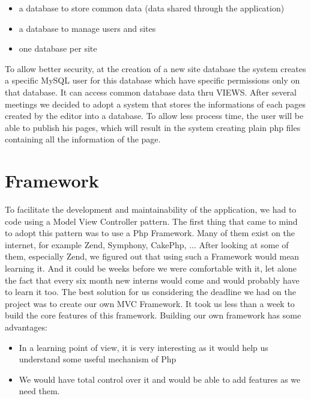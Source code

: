 \begin{itemize}
\item a database to store common data (data shared through the application)
\item a database to manage users and sites
\item one database per site 
\end{itemize}
To allow better security, at the creation of a new site database the system creates a specific MySQL user for this database which have specific permissions only on that database. It can access common database data thru VIEWS.
After several meetings we decided to adopt a system that stores the informations of each pages created by the editor into a database. To allow less process time, the user will be able to publish his pages, which will result in the system creating plain php files containing all the information of the page.

\section{Framework}

To facilitate the development and maintainability of the application, we had to code using a Model View Controller pattern. The first thing that came to mind to adopt this pattern was to use a Php Framework. Many of them exist on the internet, for example Zend, Symphony, CakePhp, ... After looking at some of them, especially Zend, we figured out that using such a Framework would mean learning it. And it could be weeks before we were comfortable with it, let alone the fact that every six month new interns would come and would probably have to learn it too. The best solution for us considering the deadline we had on the project was to create our own MVC Framework. It took us less than a week to build the core features of this framework. Building our own framework has some advantages:
\begin{itemize}
\item In a learning point of view, it is very interesting as it would help us understand some useful mechanism of Php
\item We would have total control over it and would be able to add features as we need them.
\end{itemize}

